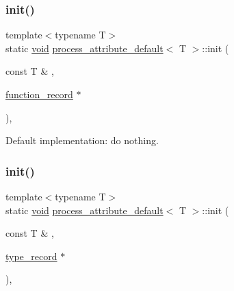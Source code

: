 \subsubsection{\texorpdfstring{init()}{init()}\hspace{0.1cm}{\footnotesize\ttfamily [1/2]}}
{\footnotesize\ttfamily template$<$typename T$>$ \\
static \mbox{\hyperlink{_s_d_l__opengles2__gl2ext_8h_ae5d8fa23ad07c48bb609509eae494c95}{void}} \mbox{\hyperlink{structprocess__attribute__default}{process\+\_\+attribute\+\_\+default}}$<$ T $>$\+::init (\begin{DoxyParamCaption}\item[{const T \&}]{,  }\item[{\mbox{\hyperlink{structfunction__record}{function\+\_\+record}} $\ast$}]{ }\end{DoxyParamCaption})\hspace{0.3cm}{\ttfamily [inline]}, {\ttfamily [static]}}



Default implementation\+: do nothing. 

\mbox{\label{structprocess__attribute__default_af4eb354b90c89daf1c6430d8353c68bb}} 
\subsubsection{\texorpdfstring{init()}{init()}\hspace{0.1cm}{\footnotesize\ttfamily [2/2]}}
{\footnotesize\ttfamily template$<$typename T$>$ \\
static \mbox{\hyperlink{_s_d_l__opengles2__gl2ext_8h_ae5d8fa23ad07c48bb609509eae494c95}{void}} \mbox{\hyperlink{structprocess__attribute__default}{process\+\_\+attribute\+\_\+default}}$<$ T $>$\+::init (\begin{DoxyParamCaption}\item[{const T \&}]{,  }\item[{\mbox{\hyperlink{structtype__record}{type\+\_\+record}} $\ast$}]{ }\end{DoxyParamCaption})\hspace{0.3cm}{\ttfamily [inline]}, {\ttfamily [static]}}

\mbox{\label{structprocess__attribute__default_a64c1e0e463184964bcfce2c26fce7849}} 
